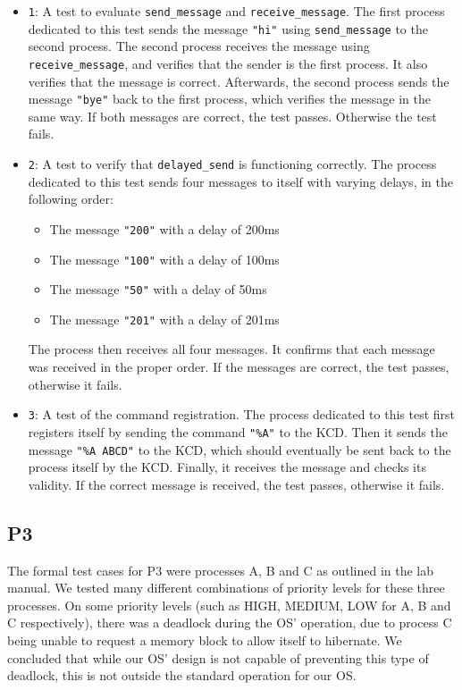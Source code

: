 \documentclass[12pt]{report}
\begin{document}
\begin{itemize}
	\item \texttt{1}: A test to evaluate \texttt{send_message} and \texttt{receive_message}.  The first process dedicated to this test sends the message \texttt{"hi"} using \texttt{send_message} to the second process.  The second process receives the message using \texttt{receive_message}, and verifies that the sender is the first process.  It also verifies that the message is correct.  Afterwards, the second process sends the message \texttt{"bye"} back to the first process, which verifies the message in the same way.  If both messages are correct, the test passes.  Otherwise the test fails.
    \item \texttt{2}: A test to verify that \texttt{delayed_send} is functioning correctly.  The process dedicated to this test sends four messages to itself with varying delays, in the following order:
    \begin{itemize}
		\item The message \texttt{"200"} with a delay of 200ms
        \item The message \texttt{"100"} with a delay of 100ms
        \item The message \texttt{"50"} with a delay of 50ms
        \item The message \texttt{"201"} with a delay of 201ms
	\end{itemize}
    The process then receives all four messages.  It confirms that each message was received in the proper order.  If the messages are correct, the test passes, otherwise it fails.
    \item \texttt{3}: A test of the command registration.  The process dedicated to this test first registers itself by sending the command \texttt{"\%A"} to the KCD.  Then it sends the message \texttt{"\%A ABCD"} to the KCD, which should eventually be sent back to the process itself by the KCD.  Finally, it receives the message and checks its validity.  If the correct message is received, the test passes, otherwise it fails.
\end{itemize}

\subsection{P3}

The formal test cases for P3 were processes A, B and C as outlined in the lab manual.  We tested many different combinations of priority levels for these three processes.  On some priority levels (such as HIGH, MEDIUM, LOW for A, B and C respectively), there was a deadlock during the OS' operation, due to process C being unable to request a memory block to allow itself to hibernate.  We concluded that while our OS' design is not capable of preventing this type of deadlock, this is not outside the standard operation for our OS.
\end{document}

